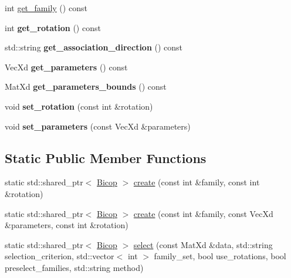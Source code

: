 {\bf }\par
\begin{DoxyCompactItemize}
\item 
int \hyperlink{class_bicop_a78a564f6e071e8dba7bcd93fdd1b05a4}{get\+\_\+family} () const 
\item 
\hypertarget{class_bicop_a0cf41f139c731d37841a411be5123155}{int {\bfseries get\+\_\+rotation} () const }\label{class_bicop_a0cf41f139c731d37841a411be5123155}

\item 
\hypertarget{class_bicop_a6758285bf2e354bbfbf8f8e0465567ba}{std\+::string {\bfseries get\+\_\+association\+\_\+direction} () const }\label{class_bicop_a6758285bf2e354bbfbf8f8e0465567ba}

\item 
\hypertarget{class_bicop_a5ae1eb1665235ea822f0f62b69085047}{Vec\+Xd {\bfseries get\+\_\+parameters} () const }\label{class_bicop_a5ae1eb1665235ea822f0f62b69085047}

\item 
\hypertarget{class_bicop_af3387cb6498e8b08c23d442a437ef6e0}{Mat\+Xd {\bfseries get\+\_\+parameters\+\_\+bounds} () const }\label{class_bicop_af3387cb6498e8b08c23d442a437ef6e0}

\item 
\hypertarget{class_bicop_af5cded47298fa11fc0f997d7a873cf92}{void {\bfseries set\+\_\+rotation} (const int \&rotation)}\label{class_bicop_af5cded47298fa11fc0f997d7a873cf92}

\item 
\hypertarget{class_bicop_a86d6d832e19d4e947fad68590e6f1b40}{void {\bfseries set\+\_\+parameters} (const Vec\+Xd \&parameters)}\label{class_bicop_a86d6d832e19d4e947fad68590e6f1b40}

\end{DoxyCompactItemize}

\subsection*{Static Public Member Functions}
\begin{DoxyCompactItemize}
\item 
static std\+::shared\+\_\+ptr$<$ \hyperlink{class_bicop}{Bicop} $>$ \hyperlink{class_bicop_acb60163725518f4ccfd7694272014686}{create} (const int \&family, const int \&rotation)
\item 
static std\+::shared\+\_\+ptr$<$ \hyperlink{class_bicop}{Bicop} $>$ \hyperlink{class_bicop_a4bfa38e69a96cc8a7c689e1161942e46}{create} (const int \&family, const Vec\+Xd \&parameters, const int \&rotation)
\item 
static std\+::shared\+\_\+ptr$<$ \hyperlink{class_bicop}{Bicop} $>$ \hyperlink{class_bicop_a6b1c154595bb17cd73f81cb4f563a776}{select} (const Mat\+Xd \&data, std\+::string selection\+\_\+criterion, std\+::vector$<$ int $>$ family\+\_\+set, bool use\+\_\+rotations, bool preselect\+\_\+families, std\+::string method)
\end{DoxyCompactItemize}
